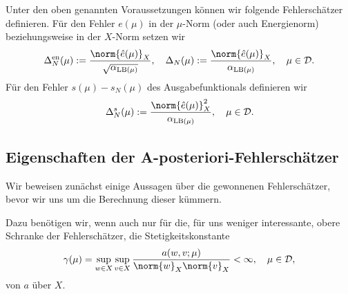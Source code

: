 \begin{Definition}
    Unter den oben genannten Voraussetzungen können wir folgende Fehlerschätzer definieren.
    Für den Fehler $e(\mu)$ in der $\mu$-Norm (oder auch Energienorm) beziehungsweise in der $X$-Norm setzen wir
    \begin{equation}
        \Delta^{\text{en}}_N(\mu) := \frac{\norm{\hat e(\mu)}_X}{\sqrt{\alpha_{\text{LB}(\mu)}}}
        , \quad
        \Delta_N(\mu) := \frac{\norm{\hat e(\mu)}_X}{\alpha_{\text{LB}(\mu)}}
        , \quad \mu \in \mathcal D.
    \end{equation}
    Für den Fehler $s(\mu) - s_N(\mu)$ des Ausgabefunktionals definieren wir
    \begin{equation}
        \Delta^s_N(\mu) := \frac{\norm{\hat e(\mu)}_X^2}{\alpha_{\text{LB}(\mu)}}, \quad \mu \in \mathcal D.
    \end{equation}
\end{Definition}


\subsection{Eigenschaften der A-posteriori-Fehlerschätzer} %
\label{sub:eigenschaften_der_a_}

Wir beweisen zunächst einige Aussagen über die gewonnenen Fehlerschätzer, bevor wir uns um die Berechnung dieser kümmern.

Dazu benötigen wir, wenn auch nur für die, für uns weniger interessante, obere Schranke der Fehlerschätzer, die Stetigkeitskonstante
\begin{equation}
    \gamma(\mu) = \sup_{w \in X} \sup_{v \in X} \frac{a(w, v; \mu)}{\norm{w}_X \norm{v}_X} < \infty, \quad \mu \in \mathcal D,
\end{equation}
von $a$ über $X$.

